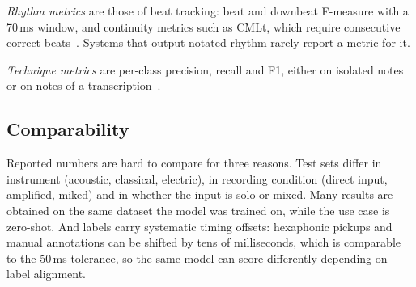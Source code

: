 \emph{Rhythm metrics} are those of beat tracking: beat and downbeat F-measure
with a 70\,ms window, and continuity metrics such as CMLt, which require
consecutive correct beats~\cite{foscarin2024beatthis}. Systems that output
notated rhythm rarely report a metric for it.

\emph{Technique metrics} are per-class precision, recall and F1, either on
isolated notes or on notes of a transcription~\cite{su2019tent,gupta2026tart}.

\subsection{Comparability}
Reported numbers are hard to compare for three reasons. Test sets differ in
instrument (acoustic, classical, electric), in recording condition (direct
input, amplified, miked) and in whether the input is solo or mixed. Many
results are obtained on the same dataset the model was trained on, while the
use case is zero-shot. And labels carry systematic timing offsets: hexaphonic
pickups and manual annotations can be shifted by tens of milliseconds, which
is comparable to the 50\,ms tolerance, so the same model can score
differently depending on label alignment.
